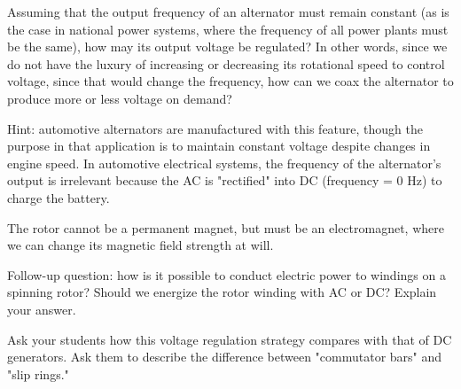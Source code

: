 

Assuming that the output frequency of an alternator must remain constant (as is the case in national power systems, where the frequency of all power plants must be the same), how may its output voltage be regulated?  In other words, since we do not have the luxury of increasing or decreasing its rotational speed to control voltage, since that would change the frequency, how can we coax the alternator to produce more or less voltage on demand?

\vskip 10pt

Hint: automotive alternators are manufactured with this feature, though the purpose in that application is to maintain constant voltage despite changes in engine speed.  In automotive electrical systems, the frequency of the alternator's output is irrelevant because the AC is "rectified" into DC (frequency = 0 Hz) to charge the battery.







The rotor cannot be a permanent magnet, but must be an electromagnet, where we can change its magnetic field strength at will.

\vskip 10pt

Follow-up question: how is it possible to conduct electric power to windings on a spinning rotor?  Should we energize the rotor winding with AC or DC?  Explain your answer.







Ask your students how this voltage regulation strategy compares with that of DC generators.  Ask them to describe the difference between "commutator bars" and "slip rings."




